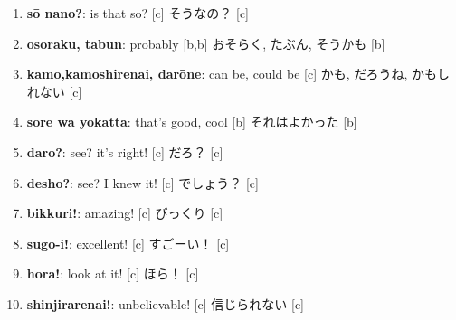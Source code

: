 \documentclass[uplatex,dvipdfmx,b5paper,english,10pt]{jsbook}
\begin{document}
\begin{enumerate}
\item
  \ifEnglish
  {\bfseries s\=o nano?}: is that so? [c]%
  \else
  そうなの？ [c]
  \fi
\item
  \ifEnglish
  {\bfseries osoraku, tabun}: probably [b,b]%
  \else
  おそらく, たぶん, そうかも [b]
  \fi
\item
  \ifEnglish
  {\bfseries kamo,kamoshirenai, dar\=one}: can be, could be [c]%
  \else
  かも, だろうね, かもしれない [c]
  \fi
\item
  \ifEnglish
  {\bfseries sore wa yokatta}: that's good, cool [b]%
  \else
  それはよかった [b]
  \fi
\item
  \ifEnglish
  {\bfseries daro?}: see? it's right! [c]%
  \else
  だろ？ [c]
  \fi
\item
  \ifEnglish
  {\bfseries desho?}: see? I knew it! [c]%
  \else
  でしょう？ [c]
  \fi
\item %
  \ifEnglish
  {\bfseries bikkuri!}: amazing! [c]%
  \else
  びっくり [c]
  \fi
\item
  \ifEnglish
  {\bfseries sugo-i!}: excellent! [c]%
  \else
  すごーい！ [c]
  \fi
\item
  \ifEnglish
  {\bfseries hora!}: look at it! [c]%
  \else
  ほら！ [c]
  \fi
\item
  \ifEnglish
  {\bfseries shinjirarenai!}: unbelievable! [c]%
  \else
  信じられない [c]
  \fi
\end{enumerate}
\end{document}
